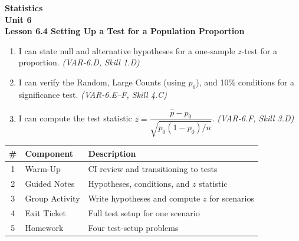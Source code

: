 \documentclass[10pt]{article}
\begin{document}
\vspace{-0.8in}

\begin{center}
  {\color{white}\textbf{\LARGE Statistics}}\\[4pt]
  {\color{skymid}\large\textbf{Unit 6}}\\[6pt]
  {\color{white}\textbf{\large Lesson 6.4 \quad Setting Up a Test for a Population Proportion}}
\end{center}

\vspace{0.22in}
\namedateperiod
\vspace{0.18in}

\begin{learningtargetbox}
\small
\begin{enumerate}[leftmargin=1.5em, itemsep=5pt]
  \item I can state null and alternative hypotheses for a one-sample $z$-test for a proportion. \textit{(VAR-6.D, Skill 1.D)}
  \item I can verify the Random, Large Counts (using $p_0$), and 10\% conditions for a significance test. \textit{(VAR-6.E--F, Skill 4.C)}
  \item I can compute the test statistic $z = \dfrac{\hat p - p_0}{\sqrt{p_0(1-p_0)/n}}$. \textit{(VAR-6.F, Skill 3.D)}
\end{enumerate}
\end{learningtargetbox}

\vspace{0.14in}

\begin{tocbox}
\small
\renewcommand{\arraystretch}{1.5}
\begin{tabularx}{\linewidth}{@{} c l X @{}}
\rowcolor{sky}
\textbf{\#} & \textbf{Component} & \textbf{Description} \\
\midrule
1 & Warm-Up        & CI review and transitioning to tests \\
2 & Guided Notes   & Hypotheses, conditions, and $z$ statistic \\
3 & Group Activity & Write hypotheses and compute $z$ for scenarios \\
4 & Exit Ticket    & Full test setup for one scenario \\
5 & Homework       & Four test-setup problems \\
\end{tabularx}
\end{tocbox}
\end{document}
